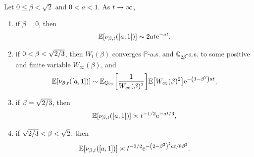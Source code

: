 \documentclass[AHL,Unicode,longabstracts,published]{cedram}
\newcommand{\e}{\mathrm{e}}
\newcommand{\E}{\mathbb{E}}
\renewcommand{\P}{\mathbb{P}}
\newcommand{\Q}{\mathbb{Q}}
\newcommand\1{\mathds{1}}
\newcommand{\Expec}[1]{\mathbb{E}\left[#1\right]}
\newcommand*{\relabel}{\renewcommand{\labelenumi}{(\theenumi)}}
\newcommand*{\romanenumi}{\renewcommand*{\theenumi}{\roman{enumi}}\relabel}
\let\originalleft\left
\let\originalright\right
\renewcommand{\left}{\mathopen{}\mathclose\bgroup\originalleft}
\renewcommand{\right}{\aftergroup\egroup\originalright}
\renewcommand*{\to}{\mathchoice{\longrightarrow}{\rightarrow}{\rightarrow}{\rightarrow}}
\begin{document}
\begin{theo}\label{thm:asymptotics_in_mean}
Let $0 \leq \beta < \sqrt{2}$ and $0 < a < 1$. As $t \to \infty$,
\begin{enumerate}\romanenumi
\item\label{it:asymptotics_in_mean_1}
if $\beta = 0$, then
\begin{equation*}
\Expec{\nu_{\beta, t}([a, 1])} \sim 2at \e^{-at},
\end{equation*}
\item\label{it:asymptotics_in_mean_2}
if $0 < \beta < \sqrt{2\smash{/}3}$, then $W_t(\beta)$ converges $\P$-a.s. and $\Q_{2\beta}$-a.s. to some positive and finite variable $W_\infty(\beta)$, and
\begin{equation*}
\Expec{\nu_{\beta, t}([a, 1])} \sim \E_{\Q_{2\beta}} \left[\frac{1}{W_\infty(\beta)^2} \right] \Expec{W_\infty(\beta)^2} \e^{-\left(1 - \beta^2\right)at},
\end{equation*}
\item\label{it:asymptotics_in_mean_3}
if $\beta = \sqrt{2\smash{/}3}$, then
\begin{equation*}
\E \left[\nu_{\beta, t}([a, 1]) \right] \asymp t^{-1/2} \e^{-at/3},
\end{equation*}
\item\label{it:asymptotics_in_mean_4}
if $\sqrt{2\smash{/}3} < \beta < \sqrt{2}$, then
\begin{equation*}
\E \left[\nu_{\beta, t}([a, 1]) \right] \asymp t^{-3/2} \e^{-\left(2 - \beta^2\right)^2at/8\beta^2}.
\end{equation*}
\end{enumerate}
\end{theo}
\end{document}
